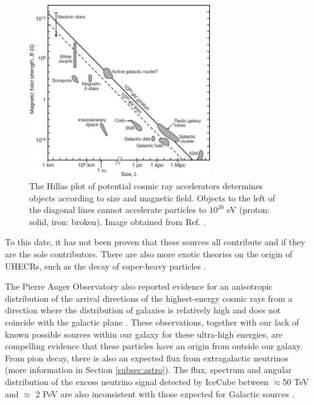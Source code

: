 \begin{figure}
\centering
\includegraphics[width = 0.7\textwidth]{chapter3/img/Hillas.jpg}
\caption{The Hillas plot of potential cosmic ray accelerators determines objects according to size and magnetic field. Objects to the left of the diagonal lines cannot accelerate particles to $10^{20}$ eV (proton: solid, iron: broken). Image obtained from Ref. \cite{Bauleo:2009zz}.}
\label{fig:hillas}
\end{figure}

To this date, it has not been proven that these sources all contribute and if they are the sole contributors. There are also more exotic theories on the origin of UHECRs, such as the decay of super-heavy particles \cite{Nagano:2000ve}.



The Pierre Auger Observatory also reported evidence for an anisotropic distribution of the arrival directions of the highest-energy cosmic rays from a direction where the distribution of galaxies is relatively high and does not coincide with the galactic plane \cite{Aab:2017tyv}. These observations, together with our lack of known possible sources within our galaxy for these ultra-high energies, are compelling evidence that these particles have an origin from outside our galaxy. From pion decay, there is also an expected flux from extragalactic neutrinos (more information in Section \ref{subsec:astro}). The flux, spectrum and angular distribution of the excess neutrino signal detected by IceCube between $\approx$50 TeV and $\approx$ 2 PeV are also inconsistent with those expected for Galactic sources \cite{Waxman:2013zda}.\\



